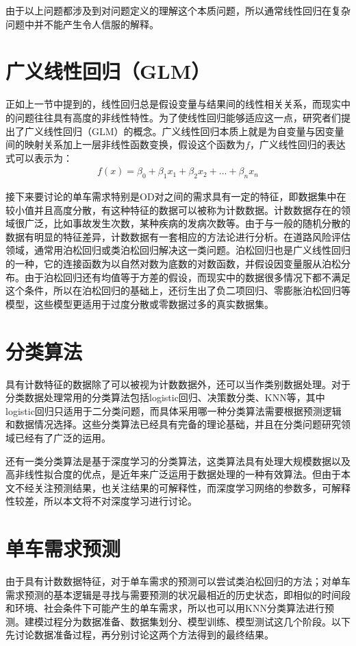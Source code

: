 \documentclass[]{tongjithesis}
\numberwithin{equation}{chapter}
\begin{document}
由于以上问题都涉及到对问题定义的理解这个本质问题，所以通常线性回归在复杂问题中并不能产生令人信服的解释。

\section{广义线性回归（GLM）}
正如上一节中提到的，线性回归总是假设变量与结果间的线性相关关系，而现实中的问题往往具有高度的非线性特性。为了使线性回归能够适应这一点，研究者们提出了广义线性回归（GLM）的概念。广义线性回归本质上就是为自变量与因变量间的映射关系加上一层非线性函数变换，假设这个函数为$f$，广义线性回归的表达式可以表示为：
\begin{align}
	f(x) = \beta_{0}+\beta_{1}x_{1}+\beta_{2}x_{2}+...+\beta_{n}x_{n}
\end{align}

接下来要讨论的单车需求特别是OD对之间的需求具有一定的特征，即数据集中在较小值并且高度分散，有这种特征的数据可以被称为计数数据。计数数据存在的领域很广泛，比如事故发生次数，某种疾病的发病次数等。由于与一般的随机分散的数据有明显的特征差异，计数数据有一套相应的方法论进行分析。在道路风险评估领域，通常用泊松回归或类泊松回归解决这一类问题\cite{mannering2014analytic}。泊松回归也是广义线性回归的一种，它的连接函数为以自然对数为底数的对数函数，并假设因变量服从泊松分布。由于泊松回归还有均值等于方差的假设，而现实中的数据很多情况下都不满足这个条件，所以在泊松回归的基础上，还衍生出了负二项回归、零膨胀泊松回归等模型，这些模型更适用于过度分散或零数据过多的真实数据集。

\section{分类算法}
具有计数特征的数据除了可以被视为计数数据外，还可以当作类别数据处理\cite{lukusa2020horvitz}。对于分类数据处理常用的分类算法包括logistic回归、决策数分类、KNN等，其中logistic回归只适用于二分类问题，而具体采用哪一种分类算法需要根据预测逻辑和数据情况选择。这些分类算法已经具有完备的理论基础，并且在分类问题研究领域已经有了广泛的运用。

还有一类分类算法是基于深度学习的分类算法，这类算法具有处理大规模数据以及高非线性拟合度的优点，是近年来广泛运用于数据处理的一种有效算法。但由于本文不经关注预测结果，也关注结果的可解释性，而深度学习网络的参数多，可解释性较差，所以本文将不对深度学习进行讨论。

\section{单车需求预测}
由于具有计数数据特征，对于单车需求的预测可以尝试类泊松回归的方法；对单车需求预测的基本逻辑是寻找与需要预测的状况最相近的历史状态，即相似的时间段和环境、社会条件下可能产生的单车需求，所以也可以用KNN分类算法进行预测。建模过程分为数据准备、数据集划分、模型训练、模型测试这几个阶段。以下先讨论数据准备过程，再分别讨论这两个方法得到的最终结果。
\end{document}
